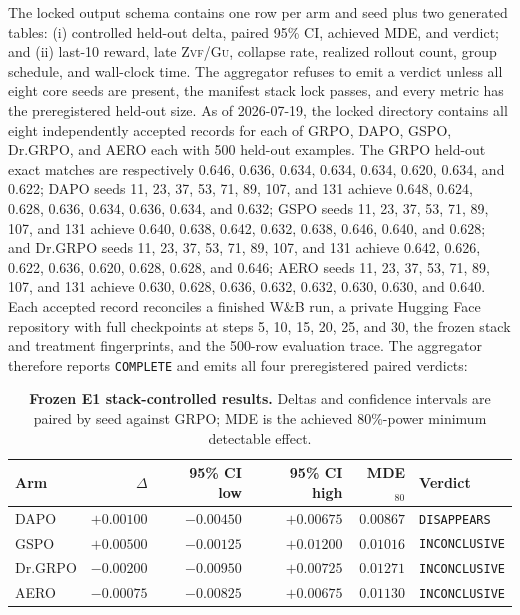 \documentclass[11pt]{article}
\newcommand{\zvf}{\textsc{Zvf}}
\newcommand{\gu}{\textsc{Gu}}
\newcommand{\grpo}{\textsc{GRPO}}
\newcommand{\AuditDAPODelta}{+0.00100}
\newcommand{\AuditDAPOCILow}{-0.00450}
\newcommand{\AuditDAPOCIHigh}{+0.00675}
\newcommand{\AuditDAPOMDE}{0.00867}
\newcommand{\AuditDAPOVerdict}{DISAPPEARS}
\newcommand{\AuditGSPODelta}{+0.00500}
\newcommand{\AuditGSPOCILow}{-0.00125}
\newcommand{\AuditGSPOCIHigh}{+0.01200}
\newcommand{\AuditGSPOMDE}{0.01016}
\newcommand{\AuditGSPOVerdict}{INCONCLUSIVE}
\newcommand{\AuditDrGRPODelta}{-0.00200}
\newcommand{\AuditDrGRPOCILow}{-0.00950}
\newcommand{\AuditDrGRPOCIHigh}{+0.00725}
\newcommand{\AuditDrGRPOMDE}{0.01271}
\newcommand{\AuditDrGRPOVerdict}{INCONCLUSIVE}
\newcommand{\AuditAERODelta}{-0.00075}
\newcommand{\AuditAEROCILow}{-0.00825}
\newcommand{\AuditAEROCIHigh}{+0.00675}
\newcommand{\AuditAEROMDE}{0.01130}
\newcommand{\AuditAEROVerdict}{INCONCLUSIVE}
\begin{document}
The locked output schema contains one row per arm and seed plus two generated
tables: (i) controlled held-out delta, paired 95\% CI, achieved MDE, and verdict;
and (ii) last-10 reward, late \zvf/\gu{}, collapse rate, realized rollout count,
group schedule, and wall-clock time. The aggregator refuses to emit a verdict
unless all eight core seeds are present, the manifest stack lock passes, and
every metric has the preregistered held-out size. As of 2026-07-19, the locked
directory contains all eight independently accepted records for each of GRPO,
DAPO, GSPO, Dr.\grpo{}, and AERO
each with 500 held-out examples. The GRPO held-out exact matches are
respectively 0.646, 0.636, 0.634, 0.634, 0.634, 0.620, 0.634, and 0.622; DAPO
seeds 11, 23, 37, 53, 71, 89, 107, and 131 achieve 0.648, 0.624, 0.628, 0.636, 0.634,
0.636, 0.634, and 0.632; GSPO seeds 11, 23, 37, 53, 71, 89, 107, and 131 achieve 0.640,
0.638, 0.642, 0.632, 0.638, 0.646, 0.640, and 0.628; and Dr.\grpo{} seeds 11, 23, 37, 53, 71, 89, 107, and
131 achieve 0.642, 0.626, 0.622, 0.636, 0.620, 0.628, 0.628, and 0.646; AERO seeds 11, 23,
37, 53, 71, 89, 107, and 131 achieve 0.630, 0.628, 0.636, 0.632, 0.632, 0.630, 0.630, and 0.640. Each accepted
record reconciles a finished W\&B run, a private Hugging Face repository with
full checkpoints at steps 5, 10, 15, 20, 25, and 30, the frozen stack and
treatment fingerprints, and the 500-row evaluation trace. The aggregator
therefore reports \texttt{COMPLETE} and emits all four preregistered paired
verdicts:

\begin{table}[t]
\centering
\caption{\textbf{Frozen E1 stack-controlled results.} Deltas and confidence
  intervals are paired by seed against GRPO; MDE is the achieved 80\%-power
  minimum detectable effect.}
\label{tab:e1-results}
\small
\begin{tabular}{@{}lrrrrl@{}}
\toprule
\textbf{Arm} & \textbf{$\Delta$} & \textbf{95\% CI low} &
\textbf{95\% CI high} & \textbf{MDE$_{80}$} & \textbf{Verdict} \\
\midrule
DAPO       & $\AuditDAPODelta$  & $\AuditDAPOCILow$  & $\AuditDAPOCIHigh$ & $\AuditDAPOMDE$ & \texttt{\AuditDAPOVerdict} \\
GSPO       & $\AuditGSPODelta$  & $\AuditGSPOCILow$  & $\AuditGSPOCIHigh$ & $\AuditGSPOMDE$ & \texttt{\AuditGSPOVerdict} \\
Dr.\grpo{} & $\AuditDrGRPODelta$ & $\AuditDrGRPOCILow$ & $\AuditDrGRPOCIHigh$ & $\AuditDrGRPOMDE$ & \texttt{\AuditDrGRPOVerdict} \\
AERO       & $\AuditAERODelta$ & $\AuditAEROCILow$ & $\AuditAEROCIHigh$ & $\AuditAEROMDE$ & \texttt{\AuditAEROVerdict} \\
\bottomrule
\end{tabular}
\end{table}
\end{document}
